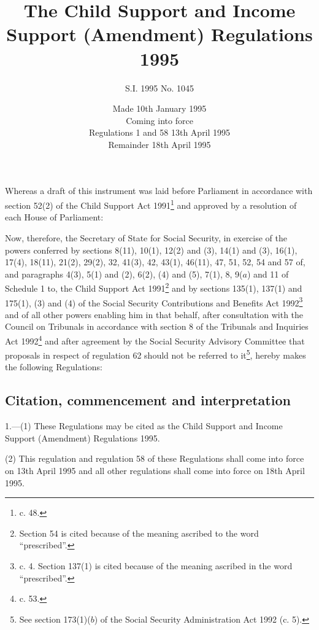\documentclass[a4paper]{article}
\title{The Child Support and Income Support (Amendment) Regulations 1995}
\author{S.I. 1995 No. 1045}
\date{Made 10th January 1995\\Coming into force\\Regulations 1 and 58 13th April 1995\\Remainder 18th April 1995}
\begin{document}
\maketitle

\noindent
Whereas a draft of this instrument was laid before Parliament in accordance with section 52(2) of the Child Support Act 1991\footnote{ c. 48.} and approved by a resolution of each House of Parliament:

 Now, therefore, the Secretary of State for Social Security, in exercise of the powers conferred by sections 8(11), 10(1), 12(2) and (3), 14(1) and (3), 16(1), 17(4), 18(11), 21(2), 29(2), 32, 41(3), 42, 43(1), 46(11), 47, 51, 52, 54 and 57 of, and paragraphs 4(3), 5(1) and (2), 6(2), (4) and (5), 7(1), 8, 9($a$) and 11 of Schedule 1 to, the Child Support Act 1991\footnote{\frenchspacing Section 54 is cited because of the meaning ascribed to the word “prescribed”.} and by sections 135(1), 137(1) and 175(1), (3) and (4) of the Social Security Contributions and Benefits Act 1992\footnote{ c. 4. Section 137(1) is cited because of the meaning ascribed in the word “prescribed”.} and of all other powers enabling him in that behalf, after consultation with the Council on Tribunals in accordance with section 8 of the Tribunals and Inquiries Act 1992\footnote{ c. 53.} and after agreement by the Social Security Advisory Committee that proposals in respect of regulation 62 should not be referred to it\footnote{\frenchspacing See section 173(1)($b$) of the Social Security Administration Act 1992 (c. 5).}, hereby makes the following Regulations:

{\sloppy

\tableofcontents

}

\setcounter{secnumdepth}{-2}

\subsection[1. Citation, commencement and interpretation]{Citation, commencement and interpretation}

1.—(1) These Regulations may be cited as the Child Support and Income Support (Amendment) Regulations 1995.

(2) This regulation and regulation 58 of these Regulations shall come into force on 13th April 1995 and all other regulations shall come into force on 18th April 1995.
\end{document}
